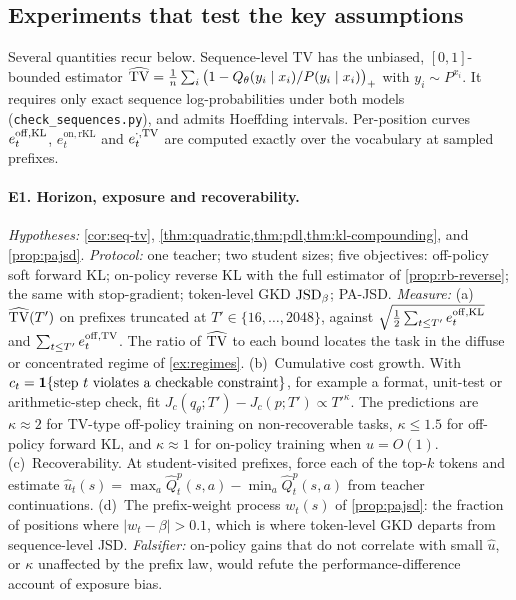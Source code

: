\subsection{Experiments that test the key assumptions}\label{sec:experiments}

Several quantities recur below. Sequence-level TV has the unbiased, $[0,1]$-bounded estimator
$\widehat{\mathrm{TV}}=\frac1n\sum_i\big(1-Q_\theta(y_i\mid x_i)/P(y_i\mid x_i)\big)_+$ with $y_i\sim P^{x_i}$. It requires only exact
sequence log-probabilities under both models (\texttt{check\_sequences.py}), and admits Hoeffding
intervals. Per-position curves $e_t^{\mathrm{off},\mathrm{KL}}$, $e_t^{\mathrm{on},\mathrm{rKL}}$ and $e_t^{\cdot,\mathrm{TV}}$ are computed
exactly over the vocabulary at sampled prefixes.

\paragraph{E1. Horizon, exposure and recoverability.}
\emph{Hypotheses:} \cref{cor:seq-tv}, \cref{thm:quadratic,thm:pdl,thm:kl-compounding}, and \cref{prop:pajsd}.
\emph{Protocol:} one teacher; two student sizes; five objectives: off-policy soft forward KL; on-policy
reverse KL with the full estimator of \cref{prop:rb-reverse}; the same with stop-gradient; token-level GKD
$\mathrm{JSD}_\beta$; PA-JSD.
\emph{Measure:} (a)~$\widehat{\mathrm{TV}}(T')$ on prefixes truncated at $T'\in\{16,\dots,2048\}$, against
$\sqrt{\frac12\sum_{t\le T'}e_t^{\mathrm{off},\mathrm{KL}}}$ and $\sum_{t\le T'}e_t^{\mathrm{off},\mathrm{TV}}$. The ratio of $\widehat{\mathrm{TV}}$ to each bound
locates the task in the diffuse or concentrated regime of \cref{ex:regimes}.
(b)~Cumulative cost growth. With $c_t=\mathbf{1}\{\text{step }t\text{ violates a checkable constraint}\}$, for example a
format, unit-test or arithmetic-step check, fit $J_c(q_\theta;T')-J_c(p;T')\propto T'^{\kappa}$. The predictions
are $\kappa\approx2$ for TV-type off-policy training on non-recoverable tasks, $\kappa\le1.5$ for off-policy
forward KL, and $\kappa\approx1$ for on-policy training when $u=O(1)$.
(c)~Recoverability. At student-visited prefixes, force each of the top-$k$ tokens and estimate
$\hat u_t(s)=\max_a\hat Q^p_t(s,a)-\min_a\hat Q^p_t(s,a)$ from teacher continuations.
(d)~The prefix-weight process $w_t(s)$ of \cref{prop:pajsd}: the fraction of positions where
$|w_t-\beta|>0.1$, which is where token-level GKD departs from sequence-level JSD.
\emph{Falsifier:} on-policy gains that do not correlate with small $\hat u$, or $\kappa$ unaffected by the prefix
law, would refute the performance-difference account of exposure bias.

